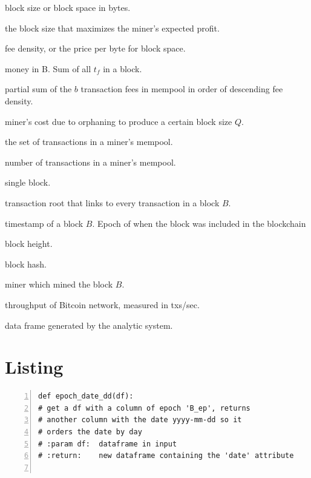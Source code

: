 \documentclass[USenglish]{uit-thesis}
\def\bitcoin{\leavevmode\rlap{\hskip.5pt-}B}
\begin{document}
\begin{appendices}
\begin{description}[leftmargin=!, labelwidth=\widthof{\bfseries $M_{demand}(b)$ }]
	\item [$Q$] block size or block space in bytes.
	\item [$Q^*$] the block size that maximizes the miner’s expected profit.
	\item [$\rho$] fee density, or the price per byte for block space.
	\item [$M$] money in \bitcoin. Sum of all $t_f$ in a block.
	\item [$M_{demand}(b)$] partial sum of the $b$ transaction fees
	in mempool in order of descending fee density.
	\item [$M_{supply}(Q)$] miner’s cost due to orphaning to produce a certain block size $Q$.
	\item [$\mathcal{N}$] the set of transactions in a miner’s mempool.
	\item [$n$] number of transactions in a miner’s mempool.
	\item [$B$] single block.
	\item [$B_t$] transaction root that links to every transaction in a block $B$.
	\item [$B_{epoch}$] timestamp of a block $B$.
	Epoch of when the block was included in the blockchain
	\item [$B_h$] block height.
	\item [$B_{ha}$] block hash.
	\item [$B_{mi}$] miner which mined the block $B$.
	\item [$\gamma$] throughput of Bitcoin network, measured in txs/sec.
	\item [$\delta$] data frame generated by the analytic system.
\end{description}

	\chapter{Listing}
	\label{app:listing}
	
	\begin{lstlisting}[numbers=left,frame=single,caption={Function for data manipulation. It creates a new column ('date'), from another ('B\_ep') containing the respective $B_{epoch}$ transformed in date time value with days as granularity.}]
def epoch_date_dd(df):
# get a df with a column of epoch 'B_ep', returns
# another column with the date yyyy-mm-dd so it
# orders the date by day
# :param df:  dataframe in input
# :return:    new dataframe containing the 'date' attribute


\end{lstlisting}
\end{appendices}
\end{document}

